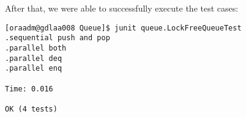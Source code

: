 \hfill
\par
After that, we were able to successfully execute the test cases:
\par
\hfill
\begin{verbatim}
[oraadm@gdlaa008 Queue]$ junit queue.LockFreeQueueTest
.sequential push and pop
.parallel both
.parallel deq
.parallel enq

Time: 0.016

OK (4 tests)
\end{verbatim}
\hfill
\par
